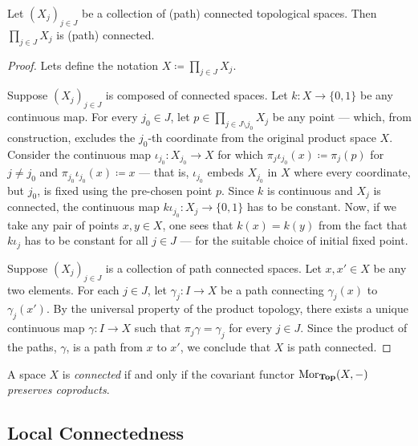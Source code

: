 \begin{proposition}
\label{prop:products-preserve-connectedness}
Let \((X_{j})_{j \in J}\) be a collection of (path) connected topological
spaces. Then \(\prod_{j \in J} X_j\) is (path) connected.
\end{proposition}

\begin{proof}
Lets define the notation \(X \coloneq \prod_{j \in J} X_j\).

Suppose \((X_j)_{j \in J}\) is composed of connected spaces. Let
\(k: X \to \{0, 1\}\) be any continuous map. For every \(j_0 \in J\), let
\(p \in \prod_{j \in J \setminus j_0} X_j\) be any point --- which, from
construction, excludes the \(j_0\)-th coordinate from the original product space
\(X\). Consider the continuous map \(\iota_{j_0}: X_{j_0} \to X\) for which
\(\pi_j \iota_{j_0}(x) \coloneq \pi_j(p)\) for \(j \neq j_0\) and
\(\pi_{j_0}\iota_{j_0}(x) \coloneq x\) --- that is, \(\iota_{j_0}\) embeds
\(X_{j_0}\) in \(X\) where every coordinate, but \(j_0\), is fixed using the
pre-chosen point \(p\). Since \(k\) is continuous and \(X_j\) is connected, the
continuous map \(k \iota_{j_0}: X_j \to \{0, 1\}\) has to be constant. Now, if
we take any pair of points \(x, y \in X\), one sees that \(k(x) = k(y)\) from
the fact that \(k \iota_j\) has to be constant for all \(j \in J\) --- for the
suitable choice of initial fixed point.

Suppose \((X_j)_{j \in J}\) is a collection of path connected spaces. Let
\(x, x' \in X\) be any two elements. For each \(j \in J\), let
\(\gamma_j: I \to X\) be a path connecting \(\gamma_j(x)\) to
\(\gamma_j(x')\). By the universal property of the product topology, there
exists a unique continuous map \(\gamma: I \to X\) such that
\(\pi_j \gamma = \gamma_j\) for every \(j \in J\). Since the product of the
paths, \(\gamma\), is a path from \(x\) to \(x'\), we conclude that \(X\) is
path connected.
\end{proof}

\begin{theorem}
\label{thm:connected-iff-cov-preserves-coprod}
A space \(X\) is \emph{connected} if and only if the covariant functor
\(\operatorname{Mor}_{{\textbf{Top}}}(X, -)\) \emph{preserves coproducts}.
\end{theorem}


\subsection{Local Connectedness}

